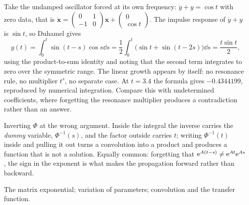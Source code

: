 \begin{worked}
Take the undamped oscillator forced at its own frequency: $\ddot y+y=\cos t$ with zero data, that is $\dot{\mathbf{x}}=\begin{pmatrix}0&1\\-1&0\end{pmatrix}\mathbf{x}+\begin{pmatrix}0\\\cos t\end{pmatrix}$. The impulse response of $\ddot y+y$ is $\sin t$, so Duhamel gives
\[y(t)=\int_0^{t}\sin(t-s)\cos s\dd s=\frac12\int_0^{t}\bigl(\sin t+\sin(t-2s)\bigr)\dd s=\frac{t\sin t}{2},\]
using the product-to-sum identity and noting that the second term integrates to zero over the symmetric range. The linear growth appears by itself: no resonance rule, no multiplier $t^{s}$, no separate case. At $t=3.4$ the formula gives $-0.4344199$, reproduced by numerical integration. Compare this with undetermined coefficients, where forgetting the resonance multiplier produces a contradiction rather than an answer.
\end{worked}

\begin{trap}
Inverting $\Phi$ at the wrong argument. Inside the integral the inverse carries the \emph{dummy} variable, $\Phi^{-1}(s)$, and the factor outside carries $t$; writing $\Phi^{-1}(t)$ inside and pulling it out turns a convolution into a product and produces a function that is not a solution. Equally common: forgetting that $\mathrm{e}^{A(t-s)}\ne\mathrm{e}^{At}\mathrm{e}^{As}$, the sign in the exponent is what makes the propagation forward rather than backward.
\end{trap}

\begin{seealsob}The matrix exponential; variation of parameters; convolution and the transfer function.\end{seealsob}

